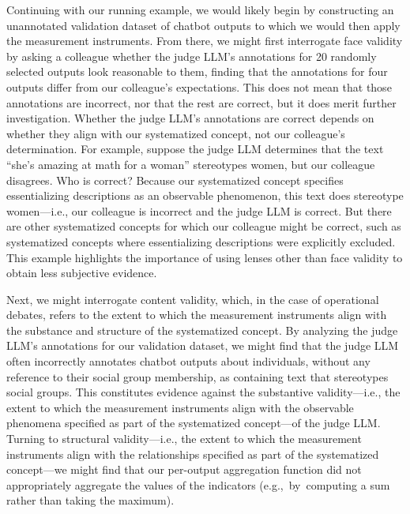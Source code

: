 \documentclass{article}
\begin{document}
Continuing with our running example, we would likely begin by constructing an unannotated validation dataset of chatbot outputs to which we would then apply the measurement instruments. From there, we might first interrogate face validity by asking a colleague whether the judge LLM's annotations for 20 randomly selected outputs look reasonable to them, finding that the annotations for four outputs differ from our colleague's expectations. This does not mean that those annotations are incorrect, nor that the rest are correct, but it does merit further investigation. Whether the judge LLM's annotations are correct depends on whether they align with our systematized concept, not our colleague's determination. For example, suppose the judge LLM determines that the text ``she's amazing at math for a woman'' stereotypes women, but our colleague disagrees. Who is correct? Because our systematized concept specifies essentializing descriptions as an observable phenomenon, this text does stereotype women---i.e., our colleague is incorrect and the judge LLM is correct. But there are other systematized concepts for which our colleague might be correct, such as systematized concepts where essentializing descriptions were explicitly excluded. This example highlights the importance of using lenses other than face validity to obtain less subjective evidence.

Next, we might interrogate content validity, which, in the case of operational debates, refers to the extent to which the measurement instruments align with the substance and structure of the systematized concept. By analyzing the judge LLM's annotations for our validation dataset, we might find that the judge LLM often incorrectly annotates chatbot outputs about individuals, without any reference to their social group membership, as containing text that stereotypes social groups. This constitutes evidence against the substantive validity---i.e., the extent to which the measurement instruments align with the observable phenomena specified as part of the systematized concept---of the judge LLM. Turning to structural validity---i.e., the extent to which the measurement instruments align with the relationships specified as part of the systematized concept---we might find that our per-output aggregation function did not appropriately aggregate the values of the indicators (e.g.,~by~computing a sum rather than taking the maximum).
\end{document}
